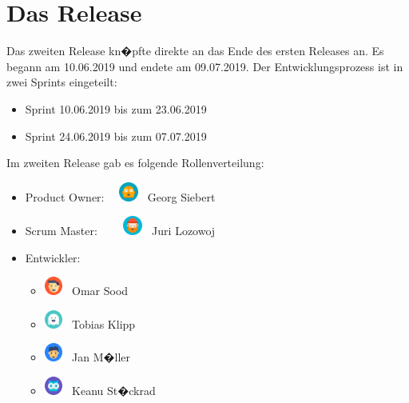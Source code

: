 \documentclass[12pt, titlepage]{scrartcl}
\newcommand{\RN}[1]{%
	\textup{\uppercase\expandafter{\romannumeral#1}}%
}
\begin{document}
	\section{Das Release \RN{2}}
		Das zweiten Release kn�pfte direkte an das Ende des ersten Releases an. Es begann am  10.06.2019 und endete am 09.07.2019. Der Entwicklungsprozess ist in zwei Sprints eingeteilt:
		\begin{itemize}
			\item Sprint \RN{3} 10.06.2019 bis zum 23.06.2019
			\item Sprint \RN{4} 24.06.2019 bis zum 07.07.2019
		\end{itemize}
		Im zweiten Release gab es folgende Rollenverteilung:
		\begin{itemize}
			\item Product Owner:  \ \ \includegraphics[width=0.05\textwidth]{georg_avatar.png} \ Georg Siebert
			\item Scrum Master:  \ \ \ \ \includegraphics[width=0.05\textwidth]{juri_avatar.png} \ Juri Lozowoj
			\item Entwickler:
			\begin{itemize}
				\item \includegraphics[width=0.05\textwidth]{omar_avatar.png} \ Omar Sood 
				\item \includegraphics[width=0.05\textwidth]{tobias_avatar.png} \ Tobias Klipp
				\item \includegraphics[width=0.05\textwidth]{jan_avatar.png} \ Jan M�ller
				\item \includegraphics[width=0.05\textwidth]{keanu_avatar.png} \ Keanu St�ckrad
			\end{itemize}
		\end{itemize}
	
\end{document}
